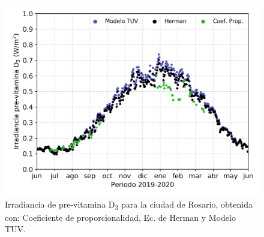 \documentclass[10pt,twocolumn]{article}
\begin{document}
\begin{figure}[ht]
  \centering
  \includegraphics[scale=0.47]{Previtamin_D.png}
  \caption{Irradiancia de pre-vitamina D\textsubscript{3} para la ciudad de Rosario, obtenida con: Coeficiente de proporcionalidad, Ec. de Herman y Modelo TUV.}
  \label{fig:previtamin}
\end{figure}
\end{document}
